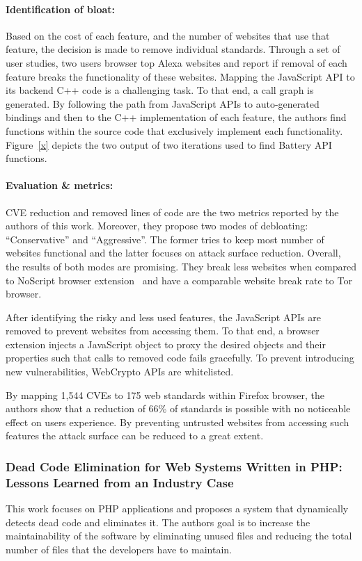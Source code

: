 \paragraph{Identification of bloat:} Based on the cost of each feature, and the number of websites that use that feature, the decision is made to remove individual standards. Through a set of user studies, two users browser top Alexa websites and report if removal of each feature breaks the functionality of these websites. Mapping the JavaScript API to its backend C++ code is a challenging task. To that end, a call graph is generated. By following the path from JavaScript APIs to auto-generated bindings and then to the C++ implementation of each feature, the authors find functions within the source code that exclusively implement each functionality. Figure~\ref{x} depicts the two output of two iterations used to find Battery API functions.
\paragraph{Evaluation \& metrics:} CVE reduction and removed lines of code are the two metrics reported by the authors of this work. Moreover, they propose two modes of debloating: ``Conservative'' and ``Aggressive''. The former tries to keep most number of websites functional and the latter focuses on attack surface reduction. Overall, the results of both modes are promising. They break less websites when compared to NoScript browser extension~\cite{noscript} and have a comparable website break rate to Tor browser.

After identifying the risky and less used features, the JavaScript APIs are removed to prevent websites from accessing them. To that end, a browser extension injects a JavaScript object to proxy the desired objects and their properties such that
calls to removed code fails gracefully. To prevent introducing new vulnerabilities, WebCrypto APIs are whitelisted.


By mapping 1,544 CVEs to 175 web standards within Firefox browser, the authors show that a reduction of 66\% of standards is possible with no noticeable effect on users experience. By preventing untrusted websites from accessing such features the attack surface can be reduced to a great extent.

\subsubsection{Dead Code Elimination for Web Systems Written in PHP: Lessons Learned from an Industry Case}
This work focuses on PHP applications and proposes a system that dynamically detects dead code and eliminates it. The authors goal is to increase the maintainability of the software by eliminating unused files and reducing the total number of files that the developers have to maintain.
